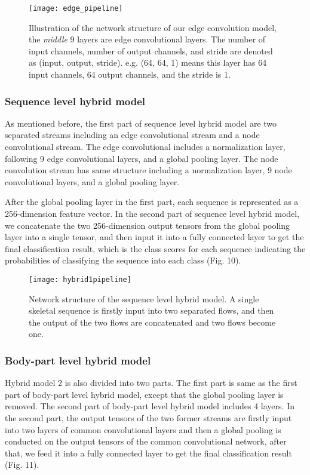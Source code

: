 \documentclass[a4paper,11pt]{article}
\begin{document}
\begin{figure}
\centering
\texttt{[image: edge\_pipeline]}
\caption{Illustration of the network structure of our edge convolution model, the {\it middle} 9 layers are edge convolutional layers. The number of input channels, number of output channels, and stride are denoted as (input, output, stride). e.g. (64, 64, 1) means this layer has 64 input channels, 64 output channels, and the stride is 1.}
\label{fig:example}
\end{figure}

\subsubsection{Sequence level hybrid model}
As mentioned before, the first part of sequence level hybrid model are two separated streams including an edge convolutional stream and a node convolutional stream. The edge convolutional includes a normalization layer, following 9 edge convolutional layers, and a global pooling layer. The node convolution stream has same structure including a normalization layer, 9 node convolutional layers, and a global pooling layer.

After the global pooling layer in the first part, each sequence is represented as a 256-dimension feature vector. In the second part of sequence level hybrid model, we concatenate the two 256-dimension output tensors from the global pooling layer into a single tensor, and then input it into a fully connected layer to get the final classification result, which is the class scores for each sequence indicating the probabilities of classifying the sequence into each class (Fig. 10).



\begin{figure}
\centering
\texttt{[image: hybrid1pipeline]}
\caption{Network structure of the sequence level hybrid model. A single skeletal sequence is firstly input into two separated flows, and then the output of the two flows are concatenated and two flows become one.}
\label{fig:example}
\end{figure}





\subsubsection{Body-part level hybrid model}
Hybrid model 2 is also divided into two parts. The first part is same as the first part of body-part level hybrid model, except that the global pooling layer is removed. The second part of body-part level hybrid model includes 4 layers. In the second part, the output tensors of the two former streams are firstly input into two layers of common convolutional layers and then a global pooling is conducted on the output tensors of the common convolutional network, after that, we feed it into a fully connected layer to get the final classification result (Fig. 11).
\end{document}
